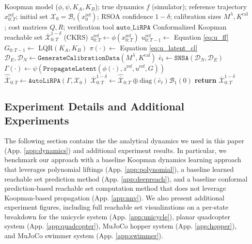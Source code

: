 \documentclass{l4dc2026}
\begin{document}
\begin{algorithm}[]

\caption{Online Conformalized Koopman Reachable Set (CKRS)}
\label{alg:online_ckrs}
\begin{algorithmic}[1]
 \Require Koopman model ($\phi, \psi, K_{A}, K_{B}$); true dynamics $f$ (simulator); reference trajectory $x^{\text{ref}}_{0:T}$; initial set $\mathcal{X}_0 = \mathcal{B}_\epsilon(x_0^{\text{ref}})$; RSOA confidence $1-\delta$; calibration sizes $M^{\lambda}, K^{\text{cal}}$; cost matrices $Q, R$; verification tool $\texttt{auto\_LiRPA}$
 \Ensure Conformalized Koopman reachable set $\overline{\mathcal{X}}^{1-\delta}_{0:T}$ (CKRS)
 \Statex {}
 \State $z^{\text{ref}}_{0:T} \gets \phi(x^{\text{ref}}_{0:T})$ 
 \State $u^{\text{ref}}_{0:T-1} \gets$ Equation \eqref{eq:u_ff} 
 \State $G_{0:T-1} \gets$ \textrm{LQR}$(K_A, K_B)$ 
 \State $\pi(\cdot) \gets$ Equation \eqref{eq:u_latent_cl} 
 \Statex {}
 \State $\mathcal{D}_E, \mathcal{D}_N \gets \texttt{GenerateCalibrationData}(M^{\lambda}, K^{\text{cal}})$
 \State $\bar e_t \gets \texttt{SNSA}(\mathcal{D}_N, \mathcal{D}_E)$
 \Statex {}
 \State $\Gamma(\cdot) \gets \psi(\texttt{PropagateLatent}(\phi(\cdot), z^{\text{ref}}, u^{\text{ref}}, G))$ 
 \State $\hat{\overline{\mathcal{X}}}_{0:T} \gets \texttt{AutoLiRPA}(\Gamma, \mathcal{X}_0)$ 
 \State $\overline{\mathcal{X}}^{1-\delta}_{0:T} \gets \hat{\overline{\mathcal{X}}}_{0:T} \oplus \textrm{diag}(\bar e_t) \mathcal{B}_1(0)$ 
 \State \textbf{return} $\overline{\mathcal{X}}^{1-\delta}_{0:T}$
\end{algorithmic}
\end{algorithm}

\subsection{Experiment Details and Additional Experiments}\label{app:parameters}

The following section contains the the analytical dynamics we used in this paper (App. \ref{app:dynamics}) and additional experiment results. In particular, we benchmark our approach with a baseline Koopman dynamics learning approach that leverages polynomial liftings (App. \ref{app:polynomial}), a baseline learned reachable set prediction method (App. \ref{app:deepreach}), and a baseline conformal prediction-based reachable set computation method that does not leverage Koopman-based propagation (App. \ref{app:nnv}). We also present additional experiment figures, including full reachable set visualizations on a per-state breakdown for the unicycle system (App. \ref{app:unicycle}), planar quadcopter system (App. \ref{app:quadcopter}), MuJoCo hopper system (App. \ref{app:hopper}), and MuJoCo swimmer system (App. \ref{app:swimmer}).
\end{document}
